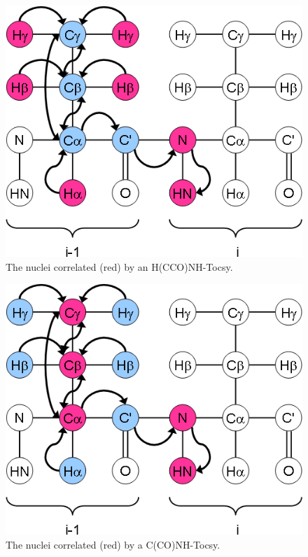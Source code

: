 \begin{figure}
  \includegraphics[scale=0.5]{figures/ccpn_hcconhtocsy}
  \caption[The nuclei correlated by an H(CCO)NH-Tocsy.]
          {The nuclei correlated (red) by an H(CCO)NH-Tocsy.}
  \label{ccpn_hcconhtocsy}
\end{figure}
\begin{figure}
  \includegraphics[scale=0.5]{figures/ccpn_cconhtocsy}
  \caption[The nuclei correlated by a C(CO)NH-Tocsy.]
          {The nuclei correlated (red) by a C(CO)NH-Tocsy.}
  \label{ccpn_cconhtocsy}
\end{figure}
